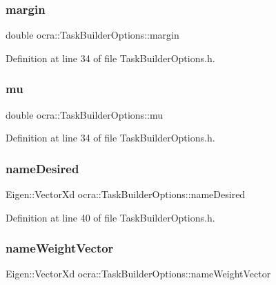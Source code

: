 \subsubsection{\texorpdfstring{margin}{margin}}
{\footnotesize\ttfamily double ocra\+::\+Task\+Builder\+Options\+::margin}



Definition at line 34 of file Task\+Builder\+Options.\+h.

\hypertarget{classocra_1_1TaskBuilderOptions_a7ddb83d62a8e4121dbc3fb2a1ee9691d}{}\label{classocra_1_1TaskBuilderOptions_a7ddb83d62a8e4121dbc3fb2a1ee9691d} 
\subsubsection{\texorpdfstring{mu}{mu}}
{\footnotesize\ttfamily double ocra\+::\+Task\+Builder\+Options\+::mu}



Definition at line 34 of file Task\+Builder\+Options.\+h.

\hypertarget{classocra_1_1TaskBuilderOptions_a1e2cceed21f5b42fbfba16f02ee87bc7}{}\label{classocra_1_1TaskBuilderOptions_a1e2cceed21f5b42fbfba16f02ee87bc7} 
\subsubsection{\texorpdfstring{name\+Desired}{nameDesired}}
{\footnotesize\ttfamily Eigen\+::\+Vector\+Xd ocra\+::\+Task\+Builder\+Options\+::name\+Desired}



Definition at line 40 of file Task\+Builder\+Options.\+h.

\hypertarget{classocra_1_1TaskBuilderOptions_a82a7eaa6cb0887e59c99cc4f97d2c818}{}\label{classocra_1_1TaskBuilderOptions_a82a7eaa6cb0887e59c99cc4f97d2c818} 
\subsubsection{\texorpdfstring{name\+Weight\+Vector}{nameWeightVector}}
{\footnotesize\ttfamily Eigen\+::\+Vector\+Xd ocra\+::\+Task\+Builder\+Options\+::name\+Weight\+Vector}



